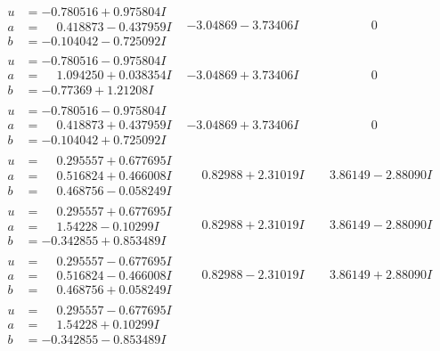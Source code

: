 \documentclass[1p]{elsarticle_modified}
\theoremstyle{definition}
\begin{document}
$$\begin{array}{c|c|c}
\begin{aligned}
u &= -0.780516 + 0.975804 I \\
a &= \phantom{-}0.418873 - 0.437959 I \\
b &= -0.104042 - 0.725092 I\end{aligned}
 & -3.04869 - 3.73406 I & \phantom{-0.000000 } 0 \\ \hline\begin{aligned}
u &= -0.780516 - 0.975804 I \\
a &= \phantom{-}1.094250 + 0.038354 I \\
b &= -0.77369 + 1.21208 I\end{aligned}
 & -3.04869 + 3.73406 I & \phantom{-0.000000 } 0 \\ \hline\begin{aligned}
u &= -0.780516 - 0.975804 I \\
a &= \phantom{-}0.418873 + 0.437959 I \\
b &= -0.104042 + 0.725092 I\end{aligned}
 & -3.04869 + 3.73406 I & \phantom{-0.000000 } 0 \\ \hline\begin{aligned}
u &= \phantom{-}0.295557 + 0.677695 I \\
a &= \phantom{-}0.516824 + 0.466008 I \\
b &= \phantom{-}0.468756 - 0.058249 I\end{aligned}
 & \phantom{-}0.82988 + 2.31019 I & \phantom{-}3.86149 - 2.88090 I \\ \hline\begin{aligned}
u &= \phantom{-}0.295557 + 0.677695 I \\
a &= \phantom{-}1.54228 - 0.10299 I \\
b &= -0.342855 + 0.853489 I\end{aligned}
 & \phantom{-}0.82988 + 2.31019 I & \phantom{-}3.86149 - 2.88090 I \\ \hline\begin{aligned}
u &= \phantom{-}0.295557 - 0.677695 I \\
a &= \phantom{-}0.516824 - 0.466008 I \\
b &= \phantom{-}0.468756 + 0.058249 I\end{aligned}
 & \phantom{-}0.82988 - 2.31019 I & \phantom{-}3.86149 + 2.88090 I \\ \hline\begin{aligned}
u &= \phantom{-}0.295557 - 0.677695 I \\
a &= \phantom{-}1.54228 + 0.10299 I \\
b &= -0.342855 - 0.853489 I\end{aligned}

\end{array}$$
\end{document}
